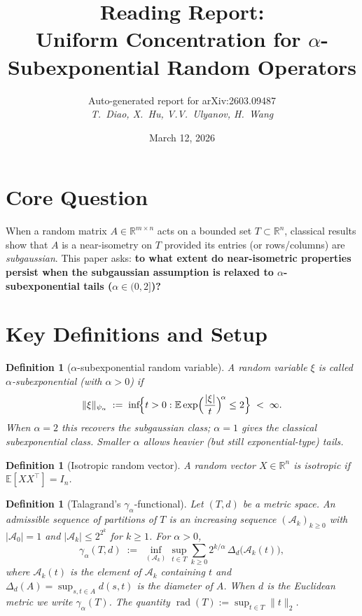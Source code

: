 \documentclass[11pt,a4paper]{article}
\title{Reading Report:\\[4pt] Uniform Concentration for $\alpha$-Subexponential Random Operators}
\author{Auto-generated report for arXiv:2603.09487\\[2pt]
\textit{T.\ Diao, X.\ Hu, V.V.\ Ulyanov, H.\ Wang}}
\date{March 12, 2026}
\newtheorem{definition}[theorem]{Definition}
\begin{document}
\maketitle

\section{Core Question}

When a random matrix $A\in\mathbb{R}^{m\times n}$ acts on a bounded set $T\subset\mathbb{R}^n$, classical results show that $A$ is a near-isometry on $T$ provided its entries (or rows/columns) are \emph{subgaussian}.
This paper asks: \textbf{to what extent do near-isometric properties persist when the subgaussian assumption is relaxed to $\alpha$-subexponential tails ($\alpha\in(0,2]$)?}

\section{Key Definitions and Setup}

\begin{definition}[$\alpha$-subexponential random variable]
A random variable $\xi$ is called \emph{$\alpha$-subexponential} (with $\alpha>0$) if
\[
  \|\xi\|_{\psi_\alpha} \;:=\; \inf\!\Bigl\{t>0 : \mathbb{E}\exp\Bigl(\frac{|\xi|}{t}\Bigr)^{\!\alpha}\le 2\Bigr\} \;<\;\infty.
\]
When $\alpha=2$ this recovers the subgaussian class; $\alpha=1$ gives the classical subexponential class. Smaller $\alpha$ allows heavier (but still exponential-type) tails.
\end{definition}

\begin{definition}[Isotropic random vector]
A random vector $X\in\mathbb{R}^n$ is \emph{isotropic} if $\mathbb{E}[XX^\top]=I_n$.
\end{definition}

\begin{definition}[Talagrand's $\gamma_\alpha$-functional]
Let $(T,d)$ be a metric space. An \emph{admissible sequence} of partitions of $T$ is an increasing sequence $(\mathcal{A}_k)_{k\ge 0}$ with $|\mathcal{A}_0|=1$ and $|\mathcal{A}_k|\le 2^{2^k}$ for $k\ge 1$. For $\alpha>0$,
\[
  \gamma_\alpha(T,d) \;:=\; \inf_{(\mathcal{A}_k)} \sup_{t\in T}\sum_{k\ge 0} 2^{k/\alpha}\,\Delta_d\!\bigl(\mathcal{A}_k(t)\bigr),
\]
where $\mathcal{A}_k(t)$ is the element of $\mathcal{A}_k$ containing $t$ and $\Delta_d(A)=\sup_{s,t\in A}d(s,t)$ is the diameter of $A$. When $d$ is the Euclidean metric we write $\gamma_\alpha(T)$. The quantity $\operatorname{rad}(T):=\sup_{t\in T}\|t\|_2$.
\end{definition}
\end{document}
